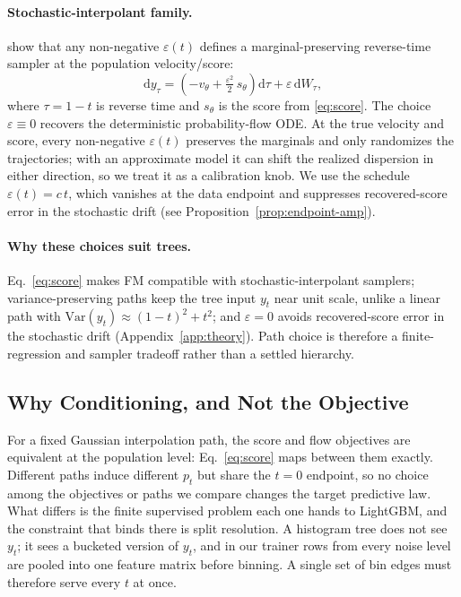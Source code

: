 \documentclass{article}
\newcommand{\Var}{\mathrm{Var}}
\newcommand{\dd}{\mathrm{d}}
\begin{document}
\paragraph{Stochastic-interpolant family.} \citet{albergo2023stochastic} show that any non-negative $\varepsilon(t)$ defines a marginal-preserving reverse-time sampler at the population velocity/score:
\begin{equation}\label{eq:sde}
\dd y_\tau = \left(-v_\theta + \tfrac{\varepsilon^2}{2}\, s_\theta\right) \dd \tau + \varepsilon\, \dd W_\tau,
\end{equation}
where $\tau = 1 - t$ is reverse time and $s_\theta$ is the score from \eqref{eq:score}. The choice $\varepsilon \equiv 0$ recovers the deterministic probability-flow ODE. At the true velocity and score, every non-negative $\varepsilon(t)$ preserves the marginals and only randomizes the trajectories; with an approximate model it can shift the realized dispersion in either direction, so we treat it as a calibration knob. We use the schedule $\varepsilon(t) = c\, t$, which vanishes at the data endpoint and suppresses recovered-score error in the stochastic drift (see Proposition~\ref{prop:endpoint-amp}).

\paragraph{Why these choices suit trees.} Eq.~\eqref{eq:score} makes FM compatible with stochastic-interpolant samplers; variance-preserving paths keep the tree input $y_t$ near unit scale, unlike a linear path with $\Var(y_t)\approx(1-t)^2+t^2$; and $\varepsilon=0$ avoids recovered-score error in the stochastic drift (Appendix~\ref{app:theory}). Path choice is therefore a finite-regression and sampler tradeoff rather than a settled hierarchy.

\subsection{Why Conditioning, and Not the Objective}\label{sec:conditioning}
For a fixed Gaussian interpolation path, the score and flow objectives are equivalent at the population level: Eq.~\eqref{eq:score} maps between them exactly. Different paths induce different $p_t$ but share the $t=0$ endpoint, so no choice among the objectives or paths we compare changes the target predictive law. What differs is the finite supervised problem each one hands to LightGBM, and the constraint that binds there is split resolution. A histogram tree does not see $y_t$; it sees a bucketed version of $y_t$, and in our trainer rows from every noise level are pooled into one feature matrix before binning. A single set of bin edges must therefore serve every $t$ at once.
\end{document}
